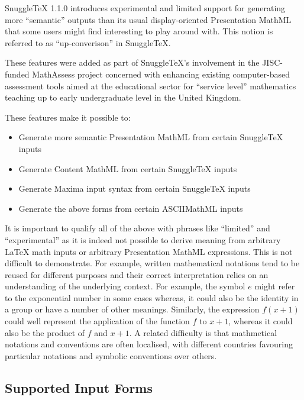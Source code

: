 
SnuggleTeX 1.1.0 introduces experimental and limited support for generating
more ``semantic'' outputs than its usual display-oriented Presentation MathML
that some users might find interesting to play around with. This notion is
referred to as ``up-converison'' in SnuggleTeX.

These features were added as part of SnuggleTeX's involvement in the
JISC-funded MathAssess project concerned with enhancing existing computer-based
assessment tools aimed at the educational sector for ``service level''
mathematics teaching up to early undergraduate level in the United Kingdom.

These features make it possible to:

\begin{itemize}

\item Generate more semantic Presentation MathML from certain SnuggleTeX inputs

\item Generate Content MathML from certain SnuggleTeX inputs

\item Generate Maxima input syntax from certain SnuggleTeX inputs

\item Generate the above forms from certain ASCIIMathML inputs

\end{itemize}

It is important to qualify all of the above with phrases like ``limited'' and ``experimental''
as it is indeed not possible to derive meaning from arbitrary LaTeX math inputs or arbitrary
Presentation MathML expressions. This is not difficult to demonstrate. For
example, written mathematical notations tend to be reused for different
purposes and their correct interpretation relies on an understanding of the
underlying context. For example, the symbol $e$ might refer to the exponential
number in some cases whereas, it could also be the identity in a group or have
a number of other meanings. Similarly, the expression $f(x+1)$ could well
represent the application of the function $f$ to $x+1$, whereas it could also
be the product of $f$ and $x+1$. A related difficulty is that mathmetical notations
and conventions are often localised, with different countries favouring particular
notations and symbolic conventions over others.

\subsection*{Supported Input Forms}

